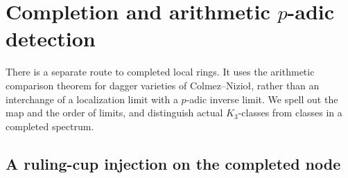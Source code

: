 \documentclass[11pt,a4paper]{amsart}
\numberwithin{equation}{section}
\theoremstyle{definition}
\theoremstyle{remark}
\begin{document}
\section{Completion and arithmetic \texorpdfstring{$p$}{p}-adic detection}\label{d3:sec:completed}

There is a separate route to completed local rings. It uses the arithmetic comparison theorem for dagger varieties of Colmez--Nizio\l, rather than an interchange of a localization limit with a $p$-adic inverse limit. We spell out the map and the order of limits, and distinguish actual $K_3$-classes from classes in a completed spectrum.

\subsection{A ruling-cup injection on the completed node}
\end{document}
